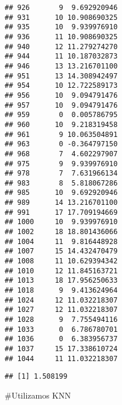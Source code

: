\documentclass[
]{article}
\newenvironment{Shaded}{\begin{snugshade}}{\end{snugshade}}
\newcommand{\DataTypeTok}[1]{\textcolor[rgb]{0.13,0.29,0.53}{#1}}
\newcommand{\DecValTok}[1]{\textcolor[rgb]{0.00,0.00,0.81}{#1}}
\newcommand{\FloatTok}[1]{\textcolor[rgb]{0.00,0.00,0.81}{#1}}
\newcommand{\KeywordTok}[1]{\textcolor[rgb]{0.13,0.29,0.53}{\textbf{#1}}}
\newcommand{\NormalTok}[1]{#1}
\newcommand{\OperatorTok}[1]{\textcolor[rgb]{0.81,0.36,0.00}{\textbf{#1}}}
\newcommand{\OtherTok}[1]{\textcolor[rgb]{0.56,0.35,0.01}{#1}}
\newcommand{\StringTok}[1]{\textcolor[rgb]{0.31,0.60,0.02}{#1}}
\begin{document}
\begin{verbatim}
## 926       9  9.692920946
## 931      10 10.908690325
## 935      10  9.939976910
## 936      11 10.908690325
## 940      12 11.279274270
## 944      11 10.187032873
## 946      13 13.216701100
## 951      13 14.308942497
## 954      10 12.722589173
## 956      10  9.094791476
## 957      10  9.094791476
## 959       0  0.005786795
## 960      10  9.218319458
## 961       9 10.063504891
## 963       0 -0.364797150
## 968       7  4.602297907
## 975       9  9.939976910
## 978       7  7.631966134
## 983       8  5.818067286
## 985      10  9.692920946
## 989      14 13.216701100
## 991      17 17.709194669
## 1000     10  9.939976910
## 1002     18 18.801436066
## 1004     11  9.816448928
## 1007     15 14.432470479
## 1008     11 10.629394342
## 1010     12 11.845163721
## 1013     18 17.956250633
## 1018      9  9.413624964
## 1024     12 11.032218307
## 1027     12 11.032218307
## 1028      9  7.755494116
## 1033      0  6.786780701
## 1036      0  6.383956737
## 1037     15 17.338610724
## 1044     11 11.032218307
\end{verbatim}

\begin{Shaded}
\end{Shaded}

\begin{verbatim}
## [1] 1.508199
\end{verbatim}

\#Utilizamos KNN

\begin{Shaded}
\end{Shaded}
\end{document}

